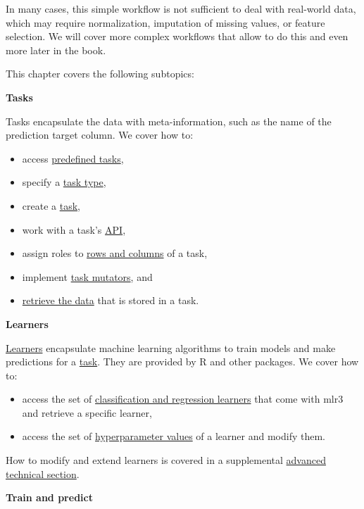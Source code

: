 \documentclass[
]{scrbook}
\providecommand{\tightlist}{%
  \setlength{\itemsep}{0pt}\setlength{\parskip}{0pt}}
\begin{document}
In many cases, this simple workflow is not sufficient to deal with real-world data, which may require normalization, imputation of missing values, or feature selection.
We will cover more complex workflows that allow to do this and even more later in the book.

This chapter covers the following subtopics:

\textbf{Tasks}

Tasks encapsulate the data with meta-information, such as the name of the prediction target column.
We cover how to:

\begin{itemize}
\tightlist
\item
  access \protect\hyperlink{tasks-predefined}{predefined tasks},
\item
  specify a \protect\hyperlink{tasks-types}{task type},
\item
  create a \protect\hyperlink{tasks-creation}{task},
\item
  work with a task's \protect\hyperlink{tasks-api}{API},
\item
  assign roles to \protect\hyperlink{tasks-roles}{rows and columns} of a task,
\item
  implement \protect\hyperlink{tasks-mutators}{task mutators}, and
\item
  \protect\hyperlink{tasks-retrieving}{retrieve the data} that is stored in a task.
\end{itemize}

\textbf{Learners}

\protect\hyperlink{learners}{Learners} encapsulate machine learning algorithms to train models and make predictions for a \protect\hyperlink{tasks}{task}.
They are provided by R and other packages.
We cover how to:

\begin{itemize}
\tightlist
\item
  access the set of \protect\hyperlink{predefined-learners}{classification and regression learners} that come with mlr3 and retrieve a specific learner,
\item
  access the set of \protect\hyperlink{predefined-learners}{hyperparameter values} of a learner and modify them.
\end{itemize}

How to modify and extend learners is covered in a supplemental \protect\hyperlink{extending-learners}{advanced technical section}.

\textbf{Train and predict}
\end{document}
